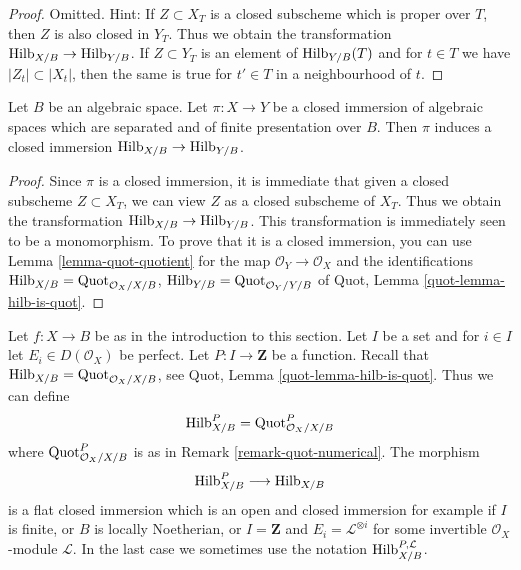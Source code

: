 \begin{proof}
Omitted. Hint: If $Z \subset X_T$ is a closed subscheme which is
proper over $T$, then $Z$ is also closed in $Y_T$. Thus we obtain
the transformation $\mathrm{Hilb}_{X/B} \to \mathrm{Hilb}_{Y/B}$.
If $Z \subset Y_T$ is an element of $\mathrm{Hilb}_{Y/B}(T)$
and for $t \in T$ we have $|Z_t| \subset |X_t|$,
then the same is true for $t' \in T$ in a neighbourhood of $t$.
\end{proof}

\begin{lemma}
\label{lemma-hilb-closed}
Let $B$ be an algebraic space. Let $\pi : X \to Y$ be a closed immersion
of algebraic spaces which are separated and of finite presentation
over $B$. Then $\pi$ induces a closed immersion
$\mathrm{Hilb}_{X/B} \to \mathrm{Hilb}_{Y/B}$.
\end{lemma}

\begin{proof}
Since $\pi$ is a closed immersion, it is immediate that given a
closed subscheme $Z \subset X_T$,
we can view $Z$ as a closed subscheme of $X_T$. Thus we obtain
the transformation $\mathrm{Hilb}_{X/B} \to \mathrm{Hilb}_{Y/B}$.
This transformation is immediately seen to be a monomorphism.
To prove that it is a closed immersion, you can use
Lemma \ref{lemma-quot-quotient} for the map
$\mathcal{O}_Y \to \mathcal{O}_X$ and the identifications
$\mathrm{Hilb}_{X/B} = \mathrm{Quot}_{\mathcal{O}_X/X/B}$,
$\mathrm{Hilb}_{Y/B} = \mathrm{Quot}_{\mathcal{O}_Y/Y/B}$
of Quot, Lemma \ref{quot-lemma-hilb-is-quot}.
\end{proof}

\begin{remark}
\label{remark-hilb-numerical}
Let $f : X \to B$ be as in the introduction to this section.
Let $I$ be a set and for $i \in I$ let $E_i \in D(\mathcal{O}_X)$ be perfect.
Let $P : I \to \mathbf{Z}$ be a function. Recall that
$\mathrm{Hilb}_{X/B} = \mathrm{Quot}_{\mathcal{O}_X/X/B}$, see
Quot, Lemma \ref{quot-lemma-hilb-is-quot}.
Thus we can define
$$
\mathrm{Hilb}^P_{X/B} = \mathrm{Quot}^P_{\mathcal{O}_X/X/B}
$$
where $\mathrm{Quot}^P_{\mathcal{O}_X/X/B}$ is as in
Remark \ref{remark-quot-numerical}. The morphism
$$
\mathrm{Hilb}^P_{X/B} \longrightarrow \mathrm{Hilb}_{X/B}
$$
is a flat closed immersion which is an open and closed immersion
for example if $I$ is finite, or $B$ is locally Noetherian, or
$I = \mathbf{Z}$ and $E_i = \mathcal{L}^{\otimes i}$ for some
invertible $\mathcal{O}_X$-module $\mathcal{L}$. In the last case
we sometimes use the notation $\mathrm{Hilb}^{P, \mathcal{L}}_{X/B}$.
\end{remark}

